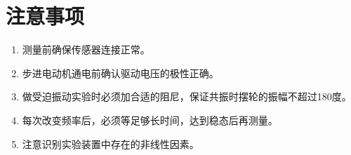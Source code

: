 \documentclass[UTF8]{ctexart}
\begin{document}
\section{注意事项}
\begin{enumerate}
    \item 测量前确保传感器连接正常。
    \item 步进电动机通电前确认驱动电压的极性正确。
    \item 做受迫振动实验时必须加合适的阻尼，保证共振时摆轮的振幅不超过180度。
    \item 每次改变频率后，必须等足够长时间，达到稳态后再测量。
    \item 注意识别实验装置中存在的非线性因素。
\end{enumerate}





\end{document}
